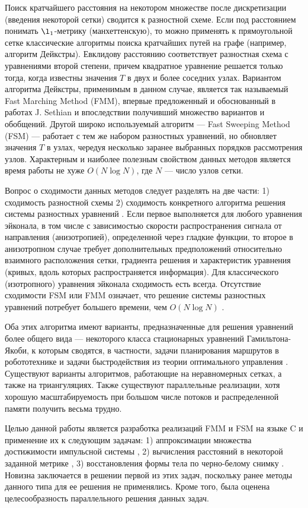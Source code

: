 Поиск кратчайшего расстояния на некотором множестве после
дискретизации (введения некоторой сетки) сводится к разностной схеме.
Если под расстоянием понимать $\l_1$-метрику (манхеттенскую), то можно
применять к прямоугольной сетке классические алгоритмы поиска
кратчайших путей на графе (например, алгоритм Дейкстры). Евклидову
расстоянию соответствует разностная схема с уравнениями второй
степени, причем квадратное уравнение решается только тогда, когда
известны значения $T$ в двух и более соседних узлах.  Вариантом
алгоритма Дейкстры, применимым в данном случае, является так
называемый Fast Marching Method (FMM), впервые предложенный и
обоснованный в работах J. Sethian \cite{S1999,AV2003} и впоследствии
получивший множество вариантов и обобщений. Другой широко используемый
алгоритм --- Fast Sweeping Method (FSM) --- работает с тем же набором
разностных уравнений, но обновляет значения $T$ в узлах, чередуя
несколько заранее выбранных порядков рассмотрения узлов.  Характерным
и наиболее полезным свойством данных методов является время работы не
хуже $O(N \log N)$, где $N$ --- число узлов сетки.
 
Вопрос о сходимости данных методов следует разделять на две части: 1)
сходимость разностной схемы 2) сходимость конкретного алгоритма
решения системы разностных уравнений \cite{J2015, A2006}.  Если первое
выполняется для любого уравнения эйконала, в том числе с зависимостью
скорости распространения сигнала от направления (анизотропией),
определенной через гладкие функции, то второе в анизотропном случае
требует дополнительных предположений относительно взаимного
расположения сетки, градиента решения и характеристик уравнения
(кривых, вдоль которых распространяется информация). Для классического
(изотропного) уравнения эйконала сходимость есть всегда.  Отсутствие
сходимости FSM или FMM означает, что решение системы разностных
уравнений потребует большего времени, чем $O(N \log N)$
\cite{E2014}.
 
Оба этих алгоритма имеют варианты, предназначенные для решения
уравнений более общего вида --- некоторого класса стационарных
уравнений Гамильтона-Якоби, к которым сводятся, в частности, задачи
планирования маршрутов в робототехнике и задачи быстродействия из
теории оптимального управления \cite{L2016}.  Существуют варианты
алгоритмов, работающие на неравномерных сетках, а также на
триангуляциях\cite{FSA2007}. Также существуют параллельные реализации,
хотя хорошую масштабируемость при большом числе потоков и
распределенной памяти получить весьма трудно.

Целью данной работы является разработка реализаций FMM и FSM на языке
C и применение их к следующим задачам: 1) аппроксимации множества
достижимости импульсной системы
\cite{D2003,AVS2016,AV2015_1,AV2015_2}, 2) вычисления расстояний в
некоторой заданной метрике \cite{KL2011}, 3) восстановления формы тела
по черно-белому снимку \cite{I2005,SFS2009, JDM2008}. Новизна
заключается в решении первой из этих задач, поскольку ранее методы
данного типа для ее решения не применялись. Кроме того, была оценена
целесообразность параллельного решения данных задач.

